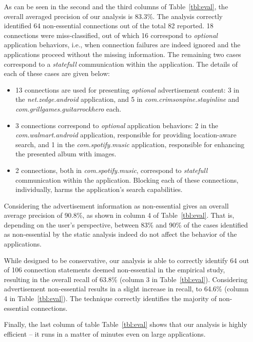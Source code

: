 As can be seen in the second and the third columns of Table~\ref{tbl:eval}, the overall averaged precision of our analysis is 83.3\%. 
The analysis correctly identified 64 non-essential connections out of the total 82 reported. 
18 connections were miss-classified, out of which 16 correspond to \emph{optional} application behaviors, i.e.,
when connection failures are indeed ignored and the applications proceed without the missing information. The 
remaining two cases correspond to a \emph{statefull} communication within the application. 
The details of each of these cases are given below: 

\begin{itemize}\setlength{\itemsep}{-0.05in}
\item 13 connections are used for presenting \emph{optional} advertisement content: 
3 in the \emph{net.zedge.android} application, and 
5 in \emph{com.crimsonpine.stayinline} and \emph{com.grillgames.guitarrockhero} each.
\item 3 connections correspond to 
\emph{optional} application behaviors: 2 in the \emph{com.walmart.android} application, responsible for providing location-aware search, and 1 in the \emph{com.spotify.music} application, responsible for enhancing the presented album with images.
\item 2 connections, both in \emph{com.spotify.music}, correspond to \emph{statefull} communication within the application. 
Blocking each of these connections, individually, harms the application's search capabilities.
\end{itemize}

Considering the advertisement information as non-essential gives an overall average precision of 90.8\%, as shown in column 4 of Table~\ref{tbl:eval}. 
That is, depending on the user's perspective, 
between 83\% and 90\% of the cases identified as non-essential by the static analysis indeed do not affect the behavior of the applications. 

While designed to be conservative, our analysis is able to correctly identify 64 out of 106 connection statements deemed non-essential in the empirical study, resulting in the overall recall of 63.8\% (column 3 in Table~\ref{tbl:eval}). Considering advertisement non-essential results in a slight increase in recall, to 64.6\% (column 4 in Table~\ref{tbl:eval}).
The technique correctly identifies the majority of non-essential connections.

Finally, the last column of table Table~\ref{tbl:eval} shows that our analysis is highly efficient -- it runs in a matter of minutes even on large applications. 

